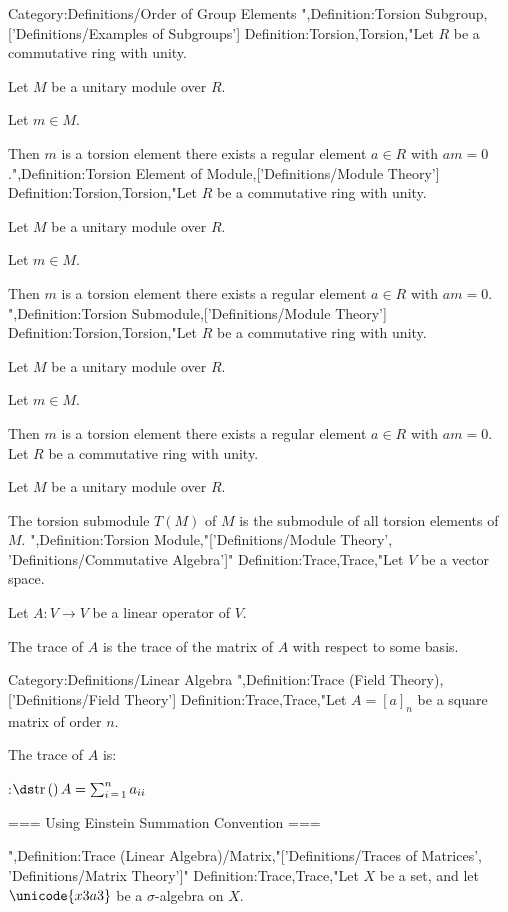 Category:Definitions/Order of Group Elements
",Definition:Torsion Subgroup,['Definitions/Examples of Subgroups']
Definition:Torsion,Torsion,"Let $R$ be a commutative ring with unity.

Let $M$ be a unitary module over $R$.

Let $m \in M$.


Then $m$ is a torsion element  there exists a regular element $a \in R$ with $a m = 0$.",Definition:Torsion Element of Module,['Definitions/Module Theory']
Definition:Torsion,Torsion,"Let $R$ be a commutative ring with unity.

Let $M$ be a unitary module over $R$.

Let $m \in M$.


Then $m$ is a torsion element  there exists a regular element $a \in R$ with $a m = 0$.
",Definition:Torsion Submodule,['Definitions/Module Theory']
Definition:Torsion,Torsion,"Let $R$ be a commutative ring with unity.

Let $M$ be a unitary module over $R$.

Let $m \in M$.


Then $m$ is a torsion element  there exists a regular element $a \in R$ with $a m = 0$.
Let $R$ be a commutative ring with unity.

Let $M$ be a unitary module over $R$.


The torsion submodule $T(M)$ of $M$ is the submodule of all torsion elements of $M$.
",Definition:Torsion Module,"['Definitions/Module Theory', 'Definitions/Commutative Algebra']"
Definition:Trace,Trace,"Let $V$ be a vector space.

Let $A: V \to V$ be a linear operator of $V$.


The trace of $A$ is the trace of the matrix of $A$ with respect to some basis.


Category:Definitions/Linear Algebra
",Definition:Trace (Field Theory),['Definitions/Field Theory']
Definition:Trace,Trace,"Let $A = \left[ a \right]_n$ be a square matrix of order $n$.


The trace of $A$ is:

:$\ds \mathrm {tr} \left(   \right)A = \sum_{i \mathop = 1}^n a_{ii}$


=== Using Einstein Summation Convention ===

",Definition:Trace (Linear Algebra)/Matrix,"['Definitions/Traces of Matrices', 'Definitions/Matrix Theory']"
Definition:Trace,Trace,"Let $X$ be a set, and let $\unicode{x3a3}$ be a $\sigma$-algebra on $X$.


